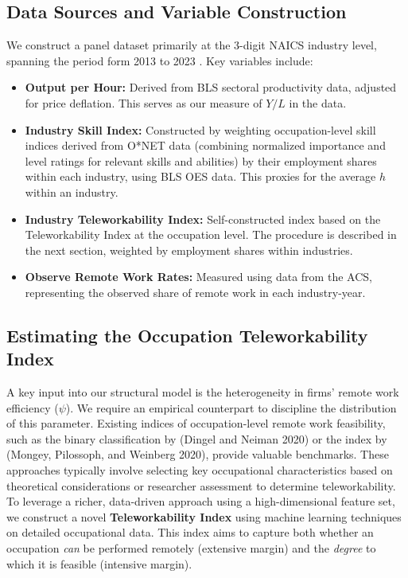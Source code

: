 \documentclass[
  11pt,
  letterpaper,
  DIV=11,
  numbers=noendperiod]{scrartcl}
\providecommand{\tightlist}{%
  \setlength{\itemsep}{0pt}\setlength{\parskip}{0pt}}\usepackage{longtable,booktabs,array}
\theoremstyle{plain}
\theoremstyle{remark}
\begin{document}
\subsection{Data Sources and Variable
Construction}\label{data-sources-and-variable-construction}

We construct a panel dataset primarily at the 3-digit NAICS industry
level, spanning the period form 2013 to 2023 . Key variables include:

\begin{itemize}
\tightlist
\item
  \textbf{Output per Hour:} Derived from BLS sectoral productivity data,
  adjusted for price deflation. This serves as our measure of \(Y/L\) in
  the data.
\item
  \textbf{Industry Skill Index:} Constructed by weighting
  occupation-level skill indices derived from O*NET data (combining
  normalized importance and level ratings for relevant skills and
  abilities) by their employment shares within each industry, using BLS
  OES data. This proxies for the average \(h\) within an industry.
\item
  \textbf{Industry Teleworkability Index:} Self-constructed index based
  on the Teleworkability Index at the occupation level. The procedure is
  described in the next section, weighted by employment shares within
  industries.
\item
  \textbf{Observe Remote Work Rates:} Measured using data from the ACS,
  representing the observed share of remote work in each industry-year.
\end{itemize}

\subsection{Estimating the Occupation Teleworkability
Index}\label{sec-teleworkability}

A key input into our structural model is the heterogeneity in firms'
remote work efficiency (\(\psi\)). We require an empirical counterpart
to discipline the distribution of this parameter. Existing indices of
occupation-level remote work feasibility, such as the binary
classification by (Dingel and Neiman 2020) or the index by (Mongey,
Pilossoph, and Weinberg 2020), provide valuable benchmarks. These
approaches typically involve selecting key occupational characteristics
based on theoretical considerations or researcher assessment to
determine teleworkability. To leverage a richer, data-driven approach
using a high-dimensional feature set, we construct a novel
\textbf{Teleworkability Index} using machine learning techniques on
detailed occupational data. This index aims to capture both whether an
occupation \emph{can} be performed remotely (extensive margin) and the
\emph{degree} to which it is feasible (intensive margin).
\end{document}
